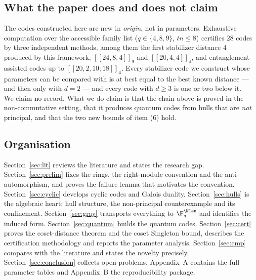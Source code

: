 \subsection{What the paper does and does not claim}

The codes constructed here are new in \emph{origin}, not in parameters.
Exhaustive computation over the accessible family list ($q\in\{4,8,9\}$,
$tn\le8$) certifies $28$ codes by three independent methods, among them the
first stabilizer distance $4$ produced by this framework, $[[24,8,4]]_9$ and
$[[20,4,4]]_4$, and entanglement-assisted codes up to $[[20,2,10;18]]_4$. Every
stabilizer code we construct whose parameters can be compared with
\cite{GrasslCodetables} is at best equal to the best known distance --- and then
only with $d=2$ --- and every code with $d\ge3$ is one or two below it. We claim
no record. What we do claim is that the chain above is proved in the
non-commutative setting, that it produces quantum codes from hulls that are
\emph{not} principal, and that the two new bounds of item (6) hold.

\subsection{Organisation}

Section~\ref{sec:lit} reviews the literature and states the research gap.
Section~\ref{sec:prelim} fixes the rings, the right-module convention and the
anti-automorphism, and proves the failure lemma that motivates the convention.
Section~\ref{sec:cyclic} develops cyclic codes and Galois duality.
Section~\ref{sec:hulls} is the algebraic heart: hull structure, the
non-principal counterexample and its confinement.
Section~\ref{sec:gray} transports everything to $\F_q^{\Nlen}$ and identifies
the induced form. Section~\ref{sec:quantum} builds the quantum codes.
Section~\ref{sec:cert} proves the coset-distance theorem and the coset Singleton
bound, describes the certification methodology and reports the parameter
analysis. Section~\ref{sec:cmp} compares with the literature and states the
novelty precisely. Section~\ref{sec:conclusion} collects open problems. Appendix~A
contains the full parameter tables and Appendix~B the reproducibility package.
